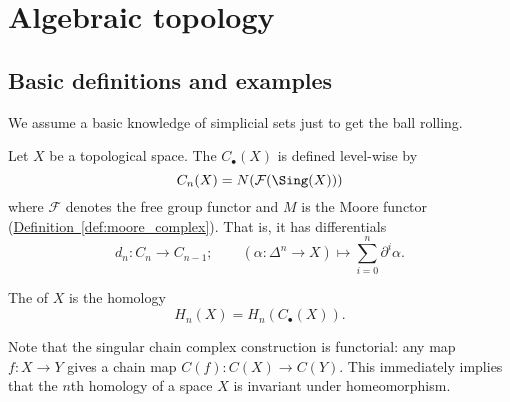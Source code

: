\documentclass[main.tex]{subfiles}
\begin{document}
\chapter{Algebraic topology}
\label{ch:algebraic_topology}

\section{Basic definitions and examples}
\label{sec:basic_definitions}

We assume a basic knowledge of simplicial sets just to get the ball rolling.

\begin{definition}
  \label{def:singular_complex_homology}
  Let $X$ be a topological space. The  $C_{\bullet}(X)$ is defined level-wise by
  \begin{equation*}
    C_{n}(X) = N(\mathcal{F}(\Sing(X)))
  \end{equation*}
  where $\mathcal{F}$ denotes the free group functor and $M$ is the Moore functor (\hyperref[def:moore_complex]{Definition~\ref*{def:moore_complex}}). That is, it has differentials
  \begin{equation*}
    d_{n}\colon C_{n} \to C_{n-1};\qquad (\alpha\colon \Delta^{n} \to X) \mapsto \sum_{i = 0}^{n} \partial^{i} \alpha.
  \end{equation*}

  The  of $X$ is the homology
  \begin{equation*}
    H_{n}(X) = H_{n}(C_{\bullet}(X)).
  \end{equation*}
\end{definition}

Note that the singular chain complex construction is functorial: any map $f\colon X \to Y$ gives a chain map $C(f)\colon C(X) \to C(Y)$. This immediately implies that the $n$th homology of a space $X$ is invariant under homeomorphism.
\end{document}
